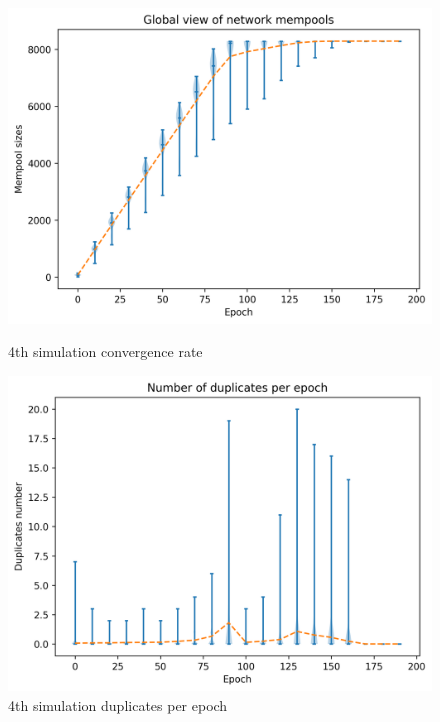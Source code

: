 \documentclass[mscthesis]{usiinfthesis}
\begin{document}
\begin{figure}[!htb]
   \begin{minipage}{0.49\textwidth}
     \centering
     \includegraphics[width=\linewidth]{images/4/4-conv.png}
  	\caption{4th simulation convergence rate}
  	\label{fig:sim-forth-conv}
   \end{minipage}\hfill
   \begin{minipage}{0.49\textwidth}
     \centering
     \includegraphics[width=\linewidth]{images/4/4-duplicates.png}
       \caption{4th simulation duplicates per epoch}
 		\label{fig:sim-forth-duplicates}
   \end{minipage}
\end{figure}
\end{document}
